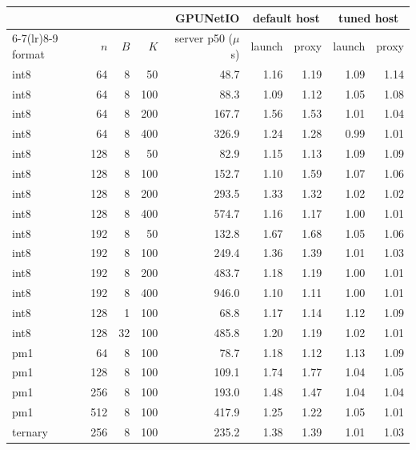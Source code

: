 \begin{tabular}{lrrrrrrrr}\toprule
 & & & & GPUNetIO & \multicolumn{2}{c}{default host} & \multicolumn{2}{c}{tuned host} \\
\cmidrule(lr){6-7}\cmidrule(lr){8-9}
format & $n$ & $B$ & $K$ & server p50 ($\mu$s) & launch & proxy & launch & proxy \\ \midrule
int8 & 64 & 8 & 50 & 48.7 & 1.16 & 1.19 & 1.09 & 1.14 \\
int8 & 64 & 8 & 100 & 88.3 & 1.09 & 1.12 & 1.05 & 1.08 \\
int8 & 64 & 8 & 200 & 167.7 & 1.56 & 1.53 & 1.01 & 1.04 \\
int8 & 64 & 8 & 400 & 326.9 & 1.24 & 1.28 & 0.99 & 1.01 \\
int8 & 128 & 8 & 50 & 82.9 & 1.15 & 1.13 & 1.09 & 1.09 \\
int8 & 128 & 8 & 100 & 152.7 & 1.10 & 1.59 & 1.07 & 1.06 \\
int8 & 128 & 8 & 200 & 293.5 & 1.33 & 1.32 & 1.02 & 1.02 \\
int8 & 128 & 8 & 400 & 574.7 & 1.16 & 1.17 & 1.00 & 1.01 \\
int8 & 192 & 8 & 50 & 132.8 & 1.67 & 1.68 & 1.05 & 1.06 \\
int8 & 192 & 8 & 100 & 249.4 & 1.36 & 1.39 & 1.01 & 1.03 \\
int8 & 192 & 8 & 200 & 483.7 & 1.18 & 1.19 & 1.00 & 1.01 \\
int8 & 192 & 8 & 400 & 946.0 & 1.10 & 1.11 & 1.00 & 1.01 \\
int8 & 128 & 1 & 100 & 68.8 & 1.17 & 1.14 & 1.12 & 1.09 \\
int8 & 128 & 32 & 100 & 485.8 & 1.20 & 1.19 & 1.02 & 1.01 \\
pm1 & 64 & 8 & 100 & 78.7 & 1.18 & 1.12 & 1.13 & 1.09 \\
pm1 & 128 & 8 & 100 & 109.1 & 1.74 & 1.77 & 1.04 & 1.05 \\
pm1 & 256 & 8 & 100 & 193.0 & 1.48 & 1.47 & 1.04 & 1.04 \\
pm1 & 512 & 8 & 100 & 417.9 & 1.25 & 1.22 & 1.05 & 1.01 \\
ternary & 256 & 8 & 100 & 235.2 & 1.38 & 1.39 & 1.01 & 1.03 \\
\bottomrule\end{tabular}

